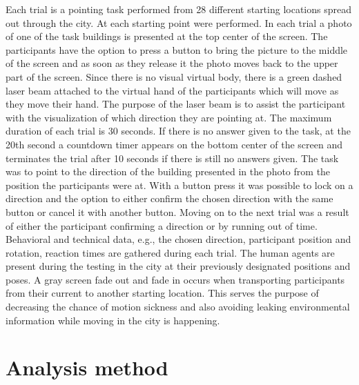 Each trial is a pointing task performed from 28 different starting locations spread out through the city. At each starting point  were performed. In each trial a photo of one of the task buildings is presented at the top center of the screen. The participants have the option to press a button to bring the picture to the middle of the screen and as soon as they release it the photo moves back to the upper part of the screen. Since there is no visual virtual body, there is a green dashed laser beam attached to the virtual hand of the participants which will move as they move their hand. The purpose of the laser beam is to assist the participant with the visualization of which direction they are pointing at. The maximum duration of each trial is 30 seconds. If there is no answer given to the task, at the 20th second a countdown timer appears on the bottom center of the screen and terminates the trial after 10 seconds if there is still no answers given.
The task was to point to the direction of the building presented in the photo from the position the participants were at. With a button press it was possible to lock on a direction and the option to either confirm the chosen direction with the same button or cancel it with another button. Moving on to the next trial was a result of either the participant confirming a direction or by running out of time. Behavioral and technical data, e.g., the chosen direction, participant position and rotation, reaction times are gathered during each trial. The human agents are present during the testing in the city at their previously designated positions and poses. A gray screen fade out and fade in occurs when transporting participants from their current to another starting location. This serves the purpose of decreasing the chance of motion sickness and also avoiding leaking environmental information while moving in the city is happening.



\section{Analysis method}

